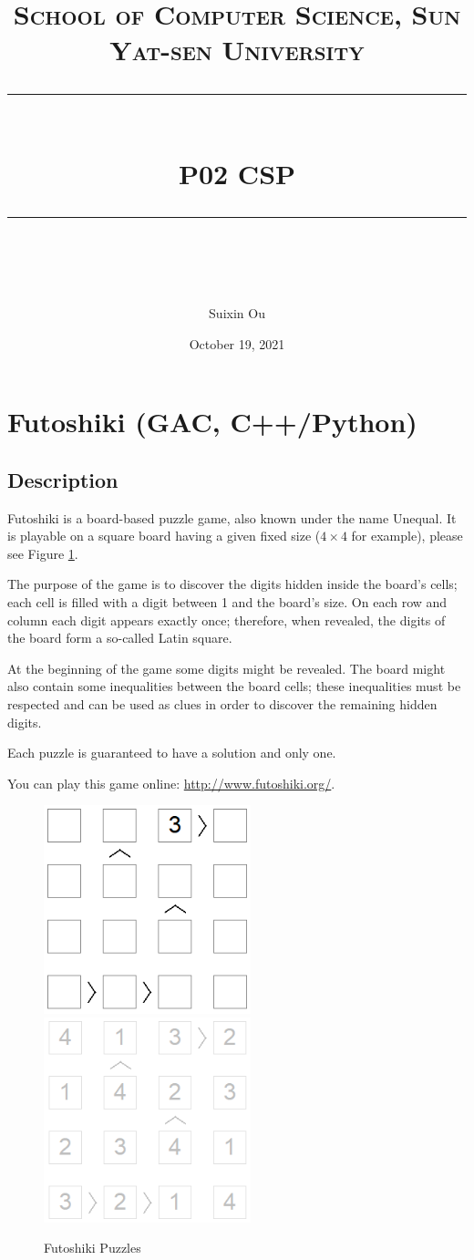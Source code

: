 ﻿\documentclass[a4paper, 11pt]{article}
\title{	
\normalfont \normalsize
\textsc{School of Computer Science, Sun Yat-sen University} \\ [25pt] %
\rule{\textwidth}{0.5pt} \\[0.4cm] %
\huge  P02  CSP\\ %
\rule{\textwidth}{2pt} \\[0.5cm] %
\author{Suixin Ou}
\date{October 19, 2021}
}
\begin{document}
\maketitle
\tableofcontents
\newpage







\section{Futoshiki (GAC, C++/Python)}
\subsection{Description}
Futoshiki is a board-based puzzle game, also known under the name Unequal. It is playable on a square board having a given fixed size ($4\times4$ for example), please see Figure \ref{fig:futoshiki}.

The purpose of the game is to discover the digits hidden inside the board's cells; each cell is filled with a digit between 1 and the board's size. On each row and column each digit appears exactly once; therefore, when revealed, the digits of the board form a so-called Latin square.

At the beginning of the game some digits might be revealed. The board might also contain some inequalities between the board cells; these inequalities must be respected and can be used as clues in order to discover the remaining hidden digits.

Each puzzle is guaranteed to have a solution and only one.

You can play this game online: \url{http://www.futoshiki.org/}.
\begin{figure}[h]
  \centering
  \includegraphics[width=6cm]{Pic/futoshiki1}
  \qquad
  \includegraphics[width=6cm]{Pic/futoshiki2}
  \caption{Futoshiki Puzzles}
  \label{fig:futoshiki}
\end{figure}
\end{document}
